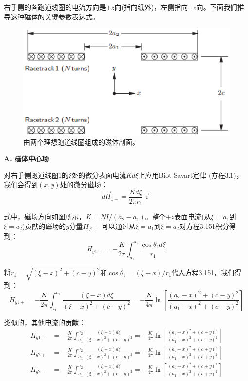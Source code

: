 右手侧的各跑道线圈的电流方向是$+z$向(指向纸外)，左侧指向$-z$向。下面我们推导这种磁体的关键参数表达式。
\begin{figure}[htbp]
	\centering
	\includegraphics[scale=0.5]{chpt3/figs/fig3.36.eps}
	\caption{由两个理想跑道线圈组成的磁体剖面。}
\end{figure}

\textbf{A. 磁体中心场}

对右手侧跑道线圈1的$\xi$处的微分表面电流$Kd\xi$上应用Biot-Savart定律 (方程3.1)，
我们会得到$(x,y)$处的微分磁场：
\begin{equation}
d\vec{H}_{1+}=\frac{K d\xi}{2\pi r_{1}}\vec{\imath}%
\end{equation}

式中，磁场方向如图所示，$K=NI/(a_2-a_1)$。整个$+z$表面电流(从$\xi=a_1$到$\xi=a_2$)贡献的磁场的$y$分量$H_{y1+}$
可以通过从$\xi=a_1$到$\xi=a_2$对方程3.151积分得到：
\begin{equation}
H_{y1+}=-\frac{K}{2\pi}\int_{a_{1}}^{a_{2}}\frac{\cos\theta_{1}d\xi}{r_{1}}%
\end{equation}

将$r_1=\sqrt{(\xi−x)^2+(c−y)^2}$和$\cos\theta_1=(\xi−x)/r_1$代入方程3.151，我们得到：
\begin{equation}
H_{y1+}=-\frac{K}{2\pi}\int_{a_{1}}^{a_{2}}\frac{(\xi-x)d\xi}{(\xi-x)^2+(c-y)^2}=
-\frac{K}{4\pi}\ln\left[\frac{(a_2-x)^2+(c-y)^2}{(a_1-x)^2+(c-y)^2}\right]%
\end{equation}

类似的，其他电流的贡献：
\begin{align*}
H_{y1-}&=-\frac{K}{2\pi}\int_{a_{1}}^{a_{2}}\frac{(\xi+x)d\xi}{(\xi+x)^{2}+(c-y)^{2}}=-\frac{K}{4\pi}\ln\left[\frac{(a_{2}+x)^{2}+(c-y)^{2}}{(a_{1}+x)^{2}+(c-y)^{2}}\right]\tag{3.152b}\\%
H_{y2+}&=-\frac{K}{2\pi}\int_{a_{1}}^{a_{2}}\frac{(\xi-x)d\xi}{(\xi-x)^{2}+(c+y)^{2}}=-\frac{K}{4\pi}\ln\left[\frac{(a_{2}-x)^{2}+(c+y)^{2}}{(a_{1}-x)^{2}+(c+y)^{2}}\right]\tag{3.152c}\\%
H_{y2-}&=-\frac{K}{2\pi}\int_{a_{1}}^{a_{2}}\frac{(\xi+x)d\xi}{(\xi+x)^{2}+(c+y)^{2}}=-\frac{K}{4\pi}\ln\left[\frac{(a_{2}+x)^{2}+(c+y)^{2}}{(a_{1}+x)^{2}+(c+y)^{2}}\right]\tag{3.152d}%
\end{align*}

